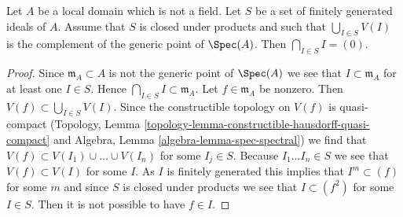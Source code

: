 \begin{lemma}
\label{lemma-big-intersection-is-zero}
Let $A$ be a local domain which is not a field.
Let $S$ be a set of finitely generated ideals of $A$.
Assume that $S$ is closed under products and such that
$\bigcup_{I \in S} V(I)$ is the complement of the generic point of $\Spec(A)$.
Then $\bigcap_{I \in S} I = (0)$.
\end{lemma}

\begin{proof}
Since $\mathfrak m_A \subset A$ is not the generic point of $\Spec(A)$
we see that $I \subset \mathfrak m_A$ for at least one $I \in S$.
Hence $\bigcap_{I \in S} I \subset \mathfrak m_A$.
Let $f \in \mathfrak m_A$ be nonzero. Then
$V(f) \subset \bigcup_{I \in S} V(I)$.
Since the constructible topology on $V(f)$ is quasi-compact
(Topology, Lemma \ref{topology-lemma-constructible-hausdorff-quasi-compact}
and
Algebra, Lemma \ref{algebra-lemma-spec-spectral})
we find that $V(f) \subset V(I_1) \cup \ldots \cup V(I_n)$
for some $I_j \in S$. Because $I_1 \ldots I_n \in S$ we see that
$V(f) \subset V(I)$ for some $I$. As $I$ is finitely generated
this implies that $I^m \subset (f)$ for some $m$ and since
$S$ is closed under products we see that $I \subset (f^2)$ for
some $I \in S$. Then it is not possible to have $f \in I$.
\end{proof}
